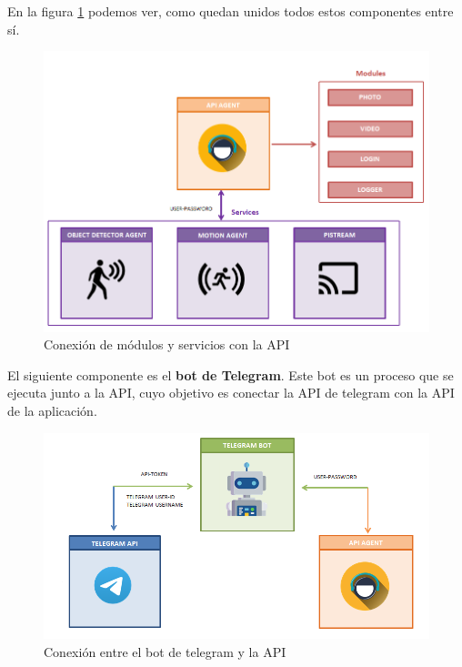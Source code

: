 En la figura \ref{img:conexionmodulosserviciosapi} podemos ver, como quedan unidos todos estos componentes entre sí.

\newpage


\begin{figure}[h]
	\centering
	\includegraphics[scale=0.35]{images/35}
	\caption{Conexión de módulos y servicios con la API}
	\label{img:conexionmodulosserviciosapi}
\end{figure}

El siguiente componente es el \textbf{bot de Telegram}. Este bot es un proceso que se ejecuta junto a la API, cuyo objetivo es conectar la API de telegram con la API de la aplicación.

\begin{figure}[h]
	\centering
	\includegraphics[scale=0.35]{images/34}
	\caption{Conexión entre el bot de telegram y la API}
	\label{img:conexionbotapitelegram}
\end{figure}

